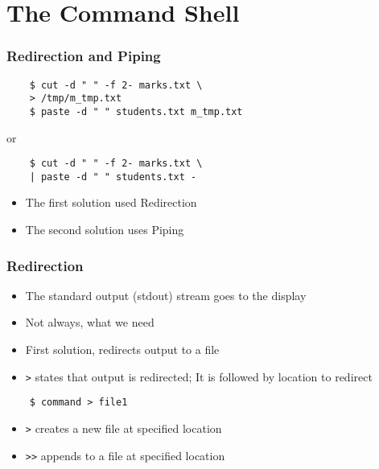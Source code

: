 \documentclass[12pt,compress]{beamer}
\begin{document}
\section{The Command Shell}

\begin{frame}[fragile]
  \frametitle{Redirection and Piping}
  \begin{lstlisting}
    $ cut -d " " -f 2- marks.txt \
    > /tmp/m_tmp.txt
    $ paste -d " " students.txt m_tmp.txt
  \end{lstlisting} %

  or

  \begin{lstlisting}
    $ cut -d " " -f 2- marks.txt \
    | paste -d " " students.txt -
  \end{lstlisting} %

  \begin{itemize}
  \item The first solution used Redirection
  \item The second solution uses Piping
  \end{itemize}
\end{frame}

\begin{frame}[fragile]
  \frametitle{Redirection} 

  \begin{itemize}
  \item The standard output (stdout) stream goes to the display
  \item Not always, what we need
  \item First solution, redirects output to a file
  \item \texttt{>} states that output is redirected; It is
    followed by location to redirect
  \end{itemize}
  \begin{lstlisting}
    $ command > file1
  \end{lstlisting} %
  \begin{itemize}
  \item \texttt{>} creates a new file at specified location
  \item \texttt{>>} appends to a file at specified location
  \end{itemize}
\end{frame}
\end{document}
